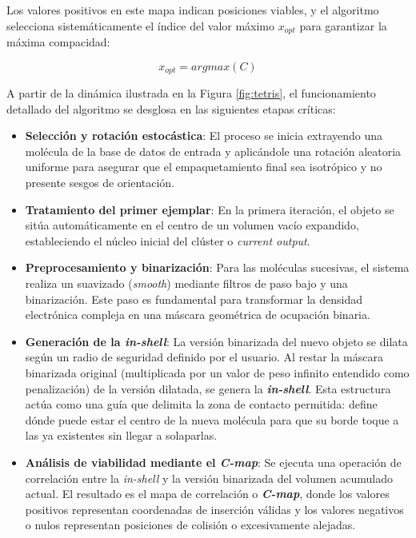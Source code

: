 Los valores positivos en este mapa indican posiciones viables, y el algoritmo selecciona sistemáticamente el índice del valor máximo $x_{opt}$ para garantizar la máxima compacidad:

\begin{equation}
x_{opt} = argmax(C)
\end{equation}

A partir de la dinámica ilustrada en la Figura \ref{fig:tetris}, el funcionamiento detallado del algoritmo se desglosa en las siguientes etapas críticas:

\begin{itemize}
    \item \textbf{Selección y rotación estocástica}: El proceso se inicia extrayendo una molécula de la base de datos de entrada y aplicándole una rotación aleatoria uniforme para asegurar que el empaquetamiento final sea isotrópico y no presente sesgos de orientación.
    
    \item \textbf{Tratamiento del primer ejemplar}: En la primera iteración, el objeto se sitúa automáticamente en el centro de un volumen vacío expandido, estableciendo el núcleo inicial del clúster o \textit{current output}.
    
    \item \textbf{Preprocesamiento y binarización}: Para las moléculas sucesivas, el sistema realiza un suavizado (\textit{smooth}) mediante filtros de paso bajo y una binarización. Este paso es fundamental para transformar la densidad electrónica compleja en una máscara geométrica de ocupación binaria.
    
    \item \textbf{Generación de la \textit{in-shell}}: La versión binarizada del nuevo objeto se dilata según un radio de seguridad definido por el usuario. Al restar la máscara binarizada original (multiplicada por un valor de peso infinito entendido como penalización) de la versión dilatada, se genera la \textbf{\textit{in-shell}}. Esta estructura actúa como una guía que delimita la zona de contacto permitida: define dónde puede estar el centro de la nueva molécula para que su borde toque a las ya existentes sin llegar a solaparlas.
    
    \item \textbf{Análisis de viabilidad mediante el \textit{C-map}}: Se ejecuta una operación de correlación entre la \textit{in-shell} y la versión binarizada del volumen acumulado actual. El resultado es el mapa de correlación o \textbf{\textit{C-map}}, donde los valores positivos representan coordenadas de inserción válidas y los valores negativos o nulos representan posiciones de colisión o excesivamente alejadas.
    

\end{itemize}
